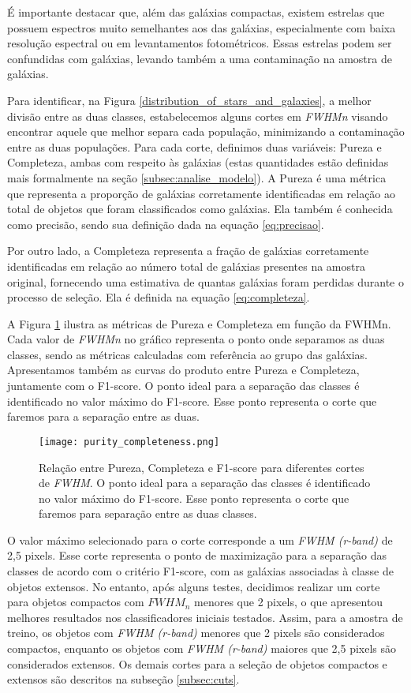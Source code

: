 É importante destacar que, além das galáxias compactas, existem estrelas que possuem espectros muito semelhantes aos das galáxias, especialmente com baixa resolução espectral ou em levantamentos fotométricos. Essas estrelas podem ser confundidas com galáxias, levando também a uma contaminação na amostra de galáxias.

Para identificar, na Figura \ref{distribution_of_stars_and_galaxies}, a melhor divisão entre as duas classes, estabelecemos alguns cortes em \textit{FWHMn} visando encontrar aquele que melhor separa cada população, minimizando a contaminação entre as duas populações. Para cada corte, definimos duas variáveis: Pureza e Completeza, ambas com respeito às galáxias (estas quantidades estão definidas mais formalmente na seção \ref{subsec:analise_modelo}). A Pureza é uma métrica que representa a proporção de galáxias corretamente identificadas em relação ao total de objetos que foram classificados como galáxias. Ela também é conhecida como precisão, sendo sua definição dada na equação \ref{eq:precisao}.

Por outro lado, a Completeza representa a fração de galáxias corretamente identificadas em relação ao número total de galáxias presentes na amostra original, fornecendo uma estimativa de quantas galáxias foram perdidas durante o processo de seleção. Ela é definida na equação \ref{eq:completeza}.

A Figura \ref{purity_completeness} ilustra as métricas de Pureza e Completeza em função da FWHMn. Cada valor de \textit{FWHMn} no gráfico representa o ponto onde separamos as duas classes, sendo as métricas calculadas com referência ao grupo das galáxias. Apresentamos também as curvas do produto entre Pureza e Completeza, juntamente com o F1-score. O ponto ideal para a separação das classes é identificado no valor máximo do F1-score. Esse ponto representa o corte que faremos para a separação entre as duas.

\begin{figure}[!ht]
    \centering
    \texttt{[image: purity\_completeness.png]}
    \caption[]{Relação entre Pureza, Completeza e F1-score para diferentes cortes de \textit{FWHM}. O ponto ideal para a separação das classes é identificado no valor máximo do F1-score. Esse ponto representa o corte que faremos para separação entre as duas classes.}
    \label{purity_completeness}
\end{figure}

O valor máximo selecionado para o corte corresponde a um \textit{FWHM (r-band)} de 2,5 pixels. Esse corte representa o ponto de maximização para a separação das classes de acordo com o critério F1-score, com as galáxias associadas à classe de objetos extensos. No entanto, após alguns testes, decidimos realizar um corte para objetos compactos com $\textit{FWHM}_n$ menores que 2 pixels, o que apresentou melhores resultados nos classificadores iniciais testados. Assim, para a amostra de treino, os objetos com \textit{FWHM (r-band)} menores que 2 pixels são considerados compactos, enquanto os objetos com \textit{FWHM (r-band)} maiores que 2,5 pixels são considerados extensos. Os demais cortes para a seleção de objetos compactos e extensos são descritos na subseção \ref{subsec:cuts}.

